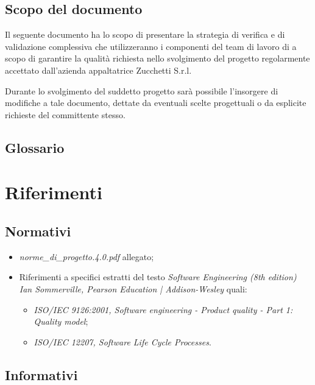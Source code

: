 \subsection{Scopo del documento}

Il seguente documento ha lo scopo di presentare la strategia di verifica e di validazione complessiva che utilizzeranno i componenti del team di lavoro di \team{} a scopo di garantire la qualità richiesta nello svolgimento del progetto \caName{} regolarmente accettato dall'azienda appaltatrice Zucchetti S.r.l.

Durante lo svolgimento del suddetto progetto sarà possibile l'insorgere di modifiche a tale documento, dettate da eventuali scelte progettuali o da esplicite richieste del committente stesso.

\subsection{Glossario}
\glossaryIntro
\clearpage

\section{Riferimenti}

\subsection{Normativi}

\begin{itemize}
\item[] \textit{norme\_di\_progetto.4.0.pdf} allegato;
\item[]  Riferimenti a specifici estratti del testo \textit{Software Engineering (8th edition) Ian Sommerville, Pearson Education | Addison-Wesley} quali:
\begin{itemize}
\item[]  \textit{ISO/IEC 9126:2001, Software engineering - Product quality - Part 1: Quality model};
\item[]  \textit{ISO/IEC 12207, Software Life Cycle Processes}.
\end{itemize}
\end{itemize}

\subsection{Informativi}

